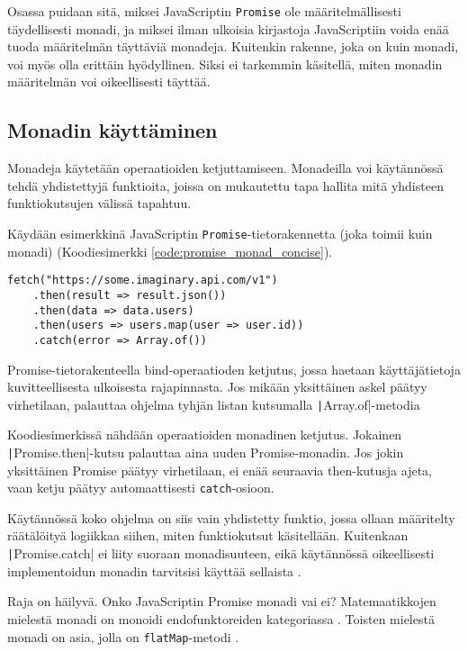 Osassa  puidaan sitä, miksei JavaScriptin \texttt{Promise} ole määritelmällisesti täydellisesti monadi, ja miksei ilman ulkoisia kirjastoja JavaScriptiin voida enää tuoda määritelmän täyttäviä monadeja. Kuitenkin rakenne, joka on kuin monadi, voi myös olla erittäin hyödyllinen. Siksi ei tarkemmin käsitellä, miten monadin määritelmän voi oikeellisesti täyttää.


\subsection{Monadin käyttäminen}

Monadeja käytetään operaatioiden ketjuttamiseen. Monadeilla voi käytännössä tehdä yhdistettyjä funktioita, joissa on mukautettu tapa hallita mitä yhdisteen funktiokutsujen välissä tapahtuu.

Käydään esimerkkinä JavaScriptin \texttt{Promise}-tietorakennetta (joka toimii kuin monadi) (Koodiesimerkki \ref{code:promise_monad_concise}).

\begin{code}
    \begin{verbatim}
fetch("https://some.imaginary.api.com/v1") 
    .then(result => result.json()) 
    .then(data => data.users)
    .then(users => users.map(user => user.id))
    .catch(error => Array.of()) 
    \end{verbatim}
    \caption{Promise-tietorakenteella bind-operaatioden ketjutus, jossa haetaan käyttäjätietoja kuvitteellisesta ulkoisesta rajapinnasta. Jos mikään yksittäinen askel päätyy virhetilaan, palauttaa ohjelma tyhjän listan kutsumalla \texttt|Array.of|-metodia}
    \label{code:promise_monad_concise}
\end{code}

Koodiesimerkissä nähdään operaatioiden monadinen ketjutus. Jokainen \texttt|Promise.then|-kutsu palauttaa aina uuden Promise-monadin. Jos jokin yksittäinen Promise päätyy virhetilaan, ei enää seuraavia then-kutusja ajeta, vaan ketju päätyy automaattisesti \texttt{catch}-osioon.

Käytännössä koko ohjelma on siis vain yhdistetty funktio, jossa ollaan määritelty räätälöityä logiikkaa siihen, miten funktiokutsut käsitellään. Kuitenkaan \texttt|Promise.catch| ei liity suoraan monadisuuteen, eikä käytännössä oikeellisesti implementoidun monadin tarvitsisi käyttää sellaista \cite{promises-spec-94}.

Raja on häilyvä. Onko JavaScriptin Promise monadi vai ei? Matemaatikkojen mielestä monadi on  monoidi endofunktoreiden kategoriassa \cite{bartosz_category_for_progamers_10,monad_wikipedia,stackoverflow_what_monad}. Toisten mielestä monadi on asia, jolla on \texttt{flatMap}-metodi \cite{stackoverflow_flatmap_monad}.

